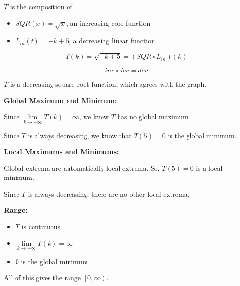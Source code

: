 \documentclass{ximera}
\begin{document}
\begin{example}
$T$ is the composition of

\begin{itemize}
\item $SQR(x) = \sqrt{x}$, an increasing core function
\item $L_{in}(t) = -k + 5$, a decreasing linear function
\end{itemize}


\[  T(k) =  \sqrt{-k+5} = (SQR \circ L_{in})(k) \]

\[ inc \circ dec = dec  \]


$T$ is a decreasing square root function, which agrees with the graph.





\textbf{Global Maximum and Minimum:} 


Since $\lim\limits_{k \to -\infty} T(k) = \infty$, we know $T$ has no global maximum.

Since $T$ is always decreasing, we know that $T(5) = 0$ is the global minimum.


\textbf{Local Maximums and Minimums:} 

Global extrema are automatically local extrema.  So, $T(5) = 0$ is a local minimum.

Since $T$ is always decreasing, there are no other local extrema.


\textbf{Range:} 

\begin{itemize}
\item $T$ is continuous
\item $\lim\limits_{k \to -\infty} T(k) = \infty$
\item $0$ is the global minimum
\end{itemize}

All of this gives the range  $\left[ 0, \infty \right)$.






\end{example}
\end{document}

